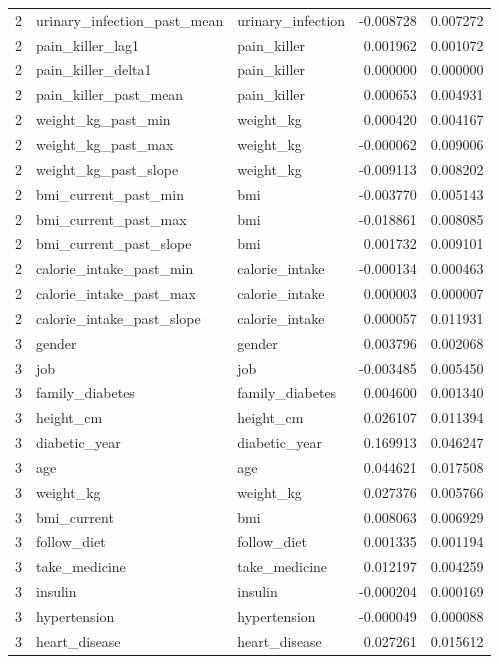 \begin{longtable}{rllrr}
2 & urinary\_infection\_past\_mean & urinary\_infection & -0.008728 & 0.007272 \\
2 & pain\_killer\_lag1 & pain\_killer & 0.001962 & 0.001072 \\
2 & pain\_killer\_delta1 & pain\_killer & 0.000000 & 0.000000 \\
2 & pain\_killer\_past\_mean & pain\_killer & 0.000653 & 0.004931 \\
2 & weight\_kg\_past\_min & weight\_kg & 0.000420 & 0.004167 \\
2 & weight\_kg\_past\_max & weight\_kg & -0.000062 & 0.009006 \\
2 & weight\_kg\_past\_slope & weight\_kg & -0.009113 & 0.008202 \\
2 & bmi\_current\_past\_min & bmi & -0.003770 & 0.005143 \\
2 & bmi\_current\_past\_max & bmi & -0.018861 & 0.008085 \\
2 & bmi\_current\_past\_slope & bmi & 0.001732 & 0.009101 \\
2 & calorie\_intake\_past\_min & calorie\_intake & -0.000134 & 0.000463 \\
2 & calorie\_intake\_past\_max & calorie\_intake & 0.000003 & 0.000007 \\
2 & calorie\_intake\_past\_slope & calorie\_intake & 0.000057 & 0.011931 \\
3 & gender & gender & 0.003796 & 0.002068 \\
3 & job & job & -0.003485 & 0.005450 \\
3 & family\_diabetes & family\_diabetes & 0.004600 & 0.001340 \\
3 & height\_cm & height\_cm & 0.026107 & 0.011394 \\
3 & diabetic\_year & diabetic\_year & 0.169913 & 0.046247 \\
3 & age & age & 0.044621 & 0.017508 \\
3 & weight\_kg & weight\_kg & 0.027376 & 0.005766 \\
3 & bmi\_current & bmi & 0.008063 & 0.006929 \\
3 & follow\_diet & follow\_diet & 0.001335 & 0.001194 \\
3 & take\_medicine & take\_medicine & 0.012197 & 0.004259 \\
3 & insulin & insulin & -0.000204 & 0.000169 \\
3 & hypertension & hypertension & -0.000049 & 0.000088 \\
3 & heart\_disease & heart\_disease & 0.027261 & 0.015612 \\

\end{longtable}
